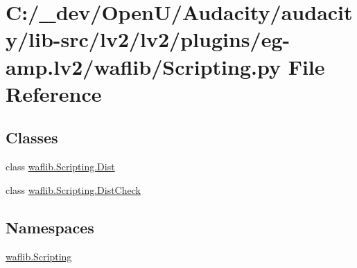 \hypertarget{lv2_2plugins_2eg-amp_8lv2_2waflib_2_scripting_8py}{}\section{C\+:/\+\_\+dev/\+Open\+U/\+Audacity/audacity/lib-\/src/lv2/lv2/plugins/eg-\/amp.lv2/waflib/\+Scripting.py File Reference}
\label{lv2_2plugins_2eg-amp_8lv2_2waflib_2_scripting_8py}
\subsection*{Classes}
\begin{DoxyCompactItemize}
\item 
class \hyperlink{classwaflib_1_1_scripting_1_1_dist}{waflib.\+Scripting.\+Dist}
\item 
class \hyperlink{classwaflib_1_1_scripting_1_1_dist_check}{waflib.\+Scripting.\+Dist\+Check}
\end{DoxyCompactItemize}
\subsection*{Namespaces}
\begin{DoxyCompactItemize}
\item 
 \hyperlink{namespacewaflib_1_1_scripting}{waflib.\+Scripting}
\end{DoxyCompactItemize}
